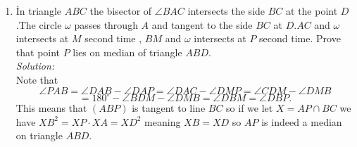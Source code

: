 \documentclass{article}
\begin{document}
\begin{enumerate}
\newpage


\item İn triangle $ABC$ the bisector of $\angle BAC$ intersects the side $BC$ at the point $D$.The circle $\omega $ passes through $A$ and tangent to the side $BC$ at $D$.$AC$ and $\omega $ intersects at $M$ second time , $BM$ and $\omega $ intersects at $P$ second time. Prove that point $P$ lies on median of triangle $ABD$.\\
\textit{Solution:}\\
Note that $$\angle PAB = \angle DAB - \angle DAP = \angle DAC - \angle DMP = \angle CDM - \angle DMB$$$$= 180^{\circ}-\angle BDM - \angle DMB = \angle DBM = \angle DBP.$$This means that $(ABP)$ is tangent to line $BC$ so if we let $X = AP \cap BC$ we have $XB^2 = XP \cdot XA = XD^2$ meaning $XB=XD$ so $AP$ is indeed a median on triangle $ABD$.

\end{enumerate}
\end{document}
